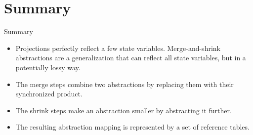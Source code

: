 \documentclass{gkibeamer}
\begin{document}
\section*{Summary}
\begin{frame}{Summary}
  \begin{itemize}
  \item \alert{Projections} \alert{perfectly} reflect \alert{a few} state
    variables. \alert{Merge-and-shrink abstractions} are a
    \alert{generalization} that can reflect \alert{all} state variables, but in
    a \alert{potentially lossy} way.
  \item The \alert{merge steps} combine two abstractions by replacing them
    with their \alert{synchronized product}.
  \item The \alert{shrink steps} make an abstraction smaller by abstracting it
    further.
  \item The resulting \alert{abstraction mapping} is represented by a set of
    reference tables. 
  \end{itemize}
\end{frame}
\end{document}
